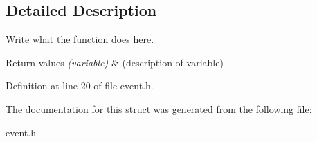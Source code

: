 \subsection{Detailed Description}
Write what the function does here. 


\begin{DoxyRetVals}{Return values}
{\em (variable)} & (description of variable) \\
\hline
\end{DoxyRetVals}


Definition at line 20 of file event.\+h.



The documentation for this struct was generated from the following file\+:\begin{DoxyCompactItemize}
\item 
event.\+h\end{DoxyCompactItemize}
